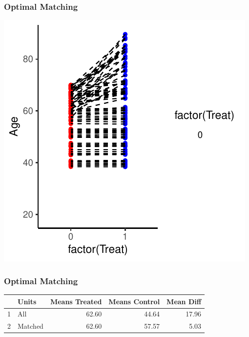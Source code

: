 \documentclass[xcolor=x11names,compress]{beamer}\usepackage[]{graphicx}\usepackage[]{color}
\makeatletter
\def\maxwidth{ %
  \ifdim\Gin@nat@width>\linewidth
    \linewidth
  \else
    \Gin@nat@width
  \fi
}
\newenvironment{knitrout}{}{} %
\renewcommand{\(}{\begin{columns}}
\renewcommand{\)}{\end{columns}}
\newcommand{\<}[1]{\begin{column}{#1}}
\renewcommand{\>}{\end{column}}
\makeatother
\begin{document}
\begin{frame}
\frametitle{Optimal Matching}
\begin{center}
\begin{knitrout}
\color{fgcolor}
\includegraphics[width=\maxwidth]{figure/optimal_matching_4-1} 

\end{knitrout}
\end{center}
\end{frame}

\begin{frame}
\frametitle{Optimal Matching}
\begin{center}
\begin{table}[ht]
\centering
\begin{tabular}{rlrrr}
  \hline
 & Units & Means Treated & Means Control & Mean Diff \\ 
  \hline
1 & All & 62.60 & 44.64 & 17.96 \\ 
  2 & Matched & 62.60 & 57.57 & 5.03 \\ 
   \hline
\end{tabular}
\end{table}

\end{center}
\end{frame}
\end{document}
